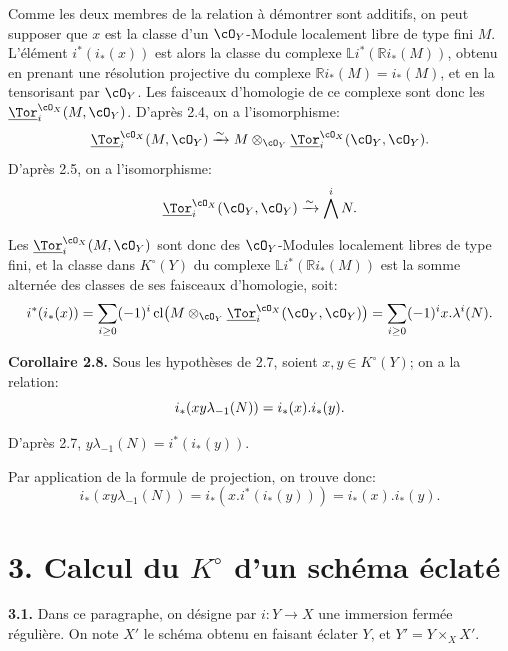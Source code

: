 Comme les deux membres de la relation à démontrer sont additifs, on peut supposer que \(x\) est la classe d'un \(\cO_Y\)-Module localement libre de type fini \(M\). L'élément \(i^*(i_*(x))\) est alors la classe du complexe \(\mathbb L i^*(\mathbb Ri_*(M))\), obtenu en prenant une résolution projective du complexe \(\mathbb Ri_*(M)=i_*(M)\), et en la tensorisant par \(\cO_Y\). Les faisceaux d'homologie de ce complexe sont donc les \(\underline{\Tor}_i^{\cO_X}(M,\cO_Y)\). D'après 2.4, on a l'isomorphisme:
\[
\underline{\Tor}_i^{\cO_X}(M,\cO_Y)
\xrightarrow{\sim}
M\otimes_{\cO_Y}\underline{\Tor}_i^{\cO_X}(\cO_Y,\cO_Y).
\]
D'après 2.5, on a l'isomorphisme:
\[
\underline{\Tor}_i^{\cO_X}(\cO_Y,\cO_Y)
\xrightarrow{\sim}
\bigwedge^i N.
\]

Les \(\underline{\Tor}_i^{\cO_X}(M,\cO_Y)\) sont donc des \(\cO_Y\)-Modules localement libres de type fini, et la classe dans \(K^\circ(Y)\) du complexe \(\mathbb L i^*(\mathbb Ri_*(M))\) est la somme alternée des classes de ses faisceaux d'homologie, soit:
\[
i^*(i_*(x))=\sum_{i\ge0}(-1)^i
\operatorname{cl}\bigl(M\otimes_{\cO_Y}\underline{\Tor}_i^{\cO_X}(\cO_Y,\cO_Y)\bigr)
=\sum_{i\ge0}(-1)^i x.\lambda^i(N).
\]

\textbf{Corollaire 2.8.} Sous les hypothèses de 2.7, soient \(x,y\in K^\circ(Y)\); on a la relation:
\begin{equation}\notag
i_*(xy\lambda_{-1}(N))=i_*(x).i_*(y).
\end{equation}

D'après 2.7, \(y\lambda_{-1}(N)=i^*(i_*(y))\).

Par application de la formule de projection, on trouve donc:
\[
i_*(xy\lambda_{-1}(N))
=i_*(x.i^*(i_*(y)))
=i_*(x).i_*(y).
\]

\section*{3. Calcul du \texorpdfstring{$K^\circ$}{K} d'un schéma éclaté}

\textbf{3.1.} Dans ce paragraphe, on désigne par \(i:Y\to X\) une immersion fermée régulière. On note \(X'\) le schéma obtenu en faisant éclater \(Y\), et \(Y'=Y\times_X X'\).
